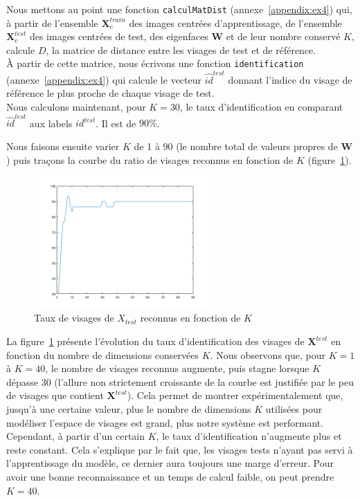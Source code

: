 \documentclass[a4paper]{article}
\newcommand{\figref}[1]{figure~\ref{#1}}
\newcommand{\annexeref}[1]{annexe~\ref{#1}}
\begin{document}
Nous mettons au point une fonction \texttt{calculMatDist}
(\annexeref{appendix:ex4}) qui, à partir de l'ensemble $\mathbf{X}^{train}_c$
des images centrées d'apprentissage, de l'ensemble $\mathbf{X}^{test}_c$ des
images centrées de test, des eigenfaces $\mathbf{W}$ et de leur nombre conservé
$\mathit{K}$, calcule $D$, la matrice de distance entre les visages de test et
de référence. \\

À partir de cette matrice, nous écrivons une fonction \texttt{identification}
(\annexeref{appendix:ex4}) qui calcule le vecteur
$\hat{id}^{test}$ donnant l'indice du visage de référence le plus proche de
chaque visage de test.\\

Nous calculons maintenant, pour $K=30$, le taux d'identification en comparant
$\hat{id}^{test}$ aux labels $id^{test}$. Il est de $90\%$. 

Nous faisons ensuite varier $K$ de 1 à 90 (le nombre total de valeurs propres de
$\mathbf{W}$) puis traçons la courbe du ratio de visages reconnus en fonction de
$K$ (\figref{fig:ex4-acc}).\\

\begin{figure}[H]
    \center
    \includegraphics[width=0.6\textwidth]{images/ex4_accuracy.png}
    \caption{Taux de visages de $X_{test}$ reconnus en fonction de
    $K$}
    \label{fig:ex4-acc}
\end{figure}

La \figref{fig:ex4-acc} présente l'évolution du taux d'identification des
visages de $\mathbf{X}^{test}$ en fonction du nombre de dimensions conservées
$K$. Nous observons que, pour $K=1$ à $K=40$, le nombre de visages reconnus
augmente, puis stagne lorsque $K$ dépasse $30$ (l'allure non strictement
croissante de la courbe est justifiée par le peu de visages que contient
$\mathbf{X}^{test}$). Cela permet de montrer expérimentalement que, jusqu'à une
certaine valeur, plus le nombre de dimensions $K$ utilisées pour modéliser
l'espace de visages est grand, plus notre système est performant. Cependant, à
partir d'un certain $K$, le taux d'identification n'augmente plus et reste
constant. Cela s'explique par le fait que, les visages tests n'ayant pas servi à
l'apprentissage du modèle, ce dernier aura toujours une marge d'erreur. Pour
avoir une bonne reconnaissance et un temps de calcul faible, on peut prendre
$K=40$.\\ 
\end{document}

